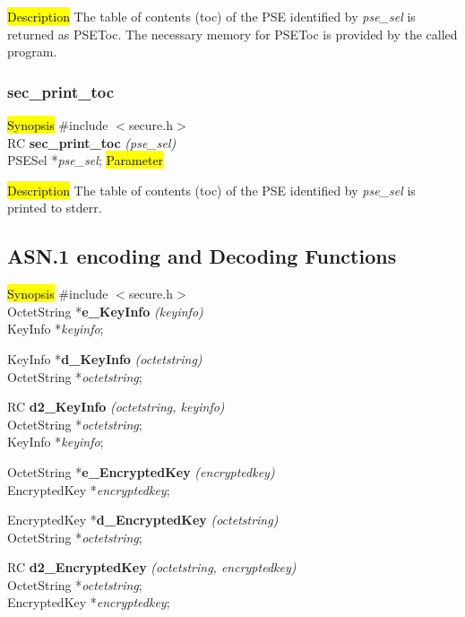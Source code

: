 \hl{Description}
The table of contents (toc) of the PSE identified by {\em pse\_sel} is returned
as PSEToc. The necessary memory for PSEToc is provided by the called program.

\subsubsection{sec\_print\_toc}
\label{sec_print_toc}
\hl{Synopsis}
\#include $<$secure.h$>$ \\ [0.5cm]
RC {\bf sec\_print\_toc} {\em (pse\_sel)} \\
PSESel *{\em pse\_sel};
\hl{Parameter}

\hl{Description}
The table of contents (toc) of the PSE identified by {\em pse\_sel} is printed to stderr.

\subsection{ASN.1 encoding and Decoding Functions}
\label{Encoding-/Decoding-Secure}
\hl{Synopsis}
\#include $<$secure.h$>$ \\ [0.5cm]
OctetString *{\bf e\_KeyInfo} {\em (keyinfo)} \\
KeyInfo *{\em keyinfo}; 

KeyInfo *{\bf d\_KeyInfo} {\em (octetstring)} \\
OctetString *{\em octetstring}; 

RC {\bf d2\_KeyInfo} {\em (octetstring, keyinfo)} \\
OctetString *{\em octetstring}; \\
KeyInfo *{\em keyinfo}; 

OctetString *{\bf e\_EncryptedKey} {\em (encryptedkey)} \\
EncryptedKey *{\em encryptedkey}; 

EncryptedKey *{\bf d\_EncryptedKey} {\em (octetstring)} \\
OctetString *{\em octetstring}; 

RC {\bf d2\_EncryptedKey} {\em (octetstring, encryptedkey)} \\
OctetString *{\em octetstring}; \\
EncryptedKey *{\em encryptedkey}; 

